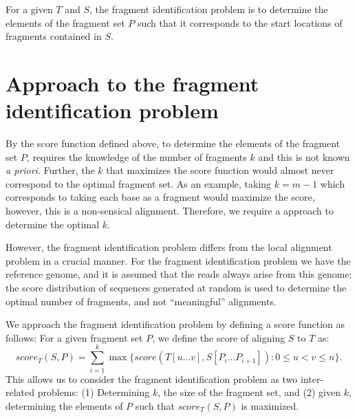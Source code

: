 For a given $T$ and $S$, the fragment identification problem is to
determine the elements of the fragment set $P$ such that it corresponds
to the start locations of fragments contained in $S$.



\section{Approach to the fragment identification problem}
By the score function defined above, to determine the elements of the
fragment set $P$, requires the knowledge of the number of fragments $k$
and this is not known \textit{a priori}. Further, the $k$ that maximizes
the score function would almost never correspond to the optimal fragment
set. As an example, taking $k=m-1$ which corresponds to taking each base
as a fragment would maximize the score, however, this is a non-sensical
alignment.
Therefore, we require a approach to determine the optimal $k$.

However, the fragment identification problem differs from the local
alignment problem in a crucial manner. For the fragment identification
problem we have the reference genome, and it is assumed that the reads
always arise from this genome; the score distribution of sequences
generated at random is used to determine the optimal number of
fragments, and not ``meaningful'' alignments.

We approach the fragment identification problem by defining a score
function as follows:
For a given fragment set $P$, we define the score of aligning $S$ to $T$
as: \[score_T(S,P) = \sum_{i=1}^{k} \max\{score(T[u \dots v], S[P_i
\dots P_{i+1}]): 0 \leq u < v \leq n\}.\] This allows us to
consider the fragment identification problem as two inter-related
problems: (1) Determining $k$, the size of the fragment set, and (2)
given $k$, determining the elements of $P$ such that $score_T(S, P)$ is
maximized.



